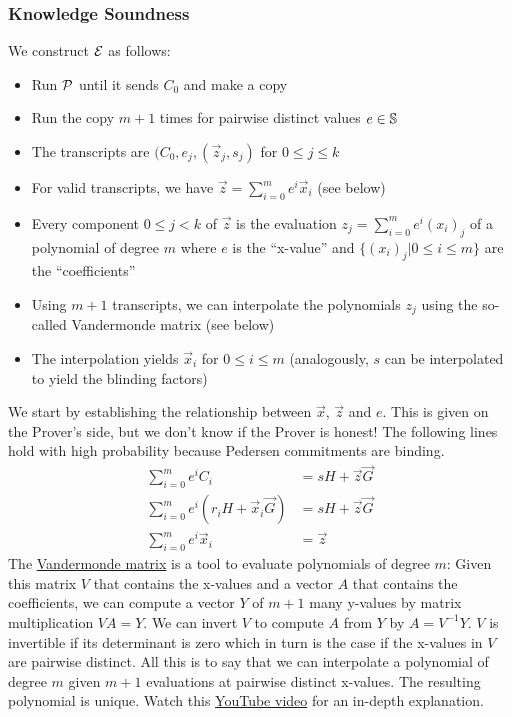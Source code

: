 \subsubsection{Knowledge Soundness}

We construct $\mathcal{E}$ as follows:
%
\begin{itemize}
    \item Run $\mathcal{P}$ until it sends $C_0$ and make a copy
    \item Run the copy $m + 1$ times for pairwise distinct values $e \in \mathbb{S}$
    \item The transcripts are $(C_0, e_j, (\vec{z}_j, s_j)$ for $0 \leq j \leq k$
    \item For valid transcripts, we have $\vec{z} = \sum^m_{i = 0} e^i \vec{x}_i$ (see below)
    \item Every component $0 \leq j < k$ of $\vec{z}$ is the evaluation $z_j = \sum^m_{i = 0} e^i (x_i)_j$ of a polynomial of degree $m$ where $e$ is the \enquote{x-value} and $\{ (x_i)_j \vert 0 \leq i \leq m \}$ are the \enquote{coefficients}
    \item Using $m + 1$ transcripts, we can interpolate the polynomials $z_j$ using the so-called Vandermonde matrix (see below)
    \item The interpolation yields $\vec{x}_i$ for $0 \leq i \leq m$ (analogously, $s$ can be interpolated to yield the blinding factors)
\end{itemize}
%
We start by establishing the relationship between $\vec{x}$, $\vec{z}$ and $e$.
This is given on the Prover's side, but we don't know if the Prover is honest!
The following lines hold with high probability because Pedersen commitments are binding.
%
\begin{align*}
    \sum^m_{i = 0} e^i C_i &= sH + \vec{z}\vec{G} \\
    \sum^m_{i = 0} e^i (r_iH + \vec{x}_i\vec{G}) &= sH + \vec{z}\vec{G} \\
    \sum^m_{i = 0} e^i \vec{x}_i &= \vec{z}
\end{align*}
%
The \href{https://en.wikipedia.org/wiki/Vandermonde\_matrix}{Vandermonde matrix} is a tool to evaluate polynomials of degree $m$:
Given this matrix $V$ that contains the x-values and a vector $A$ that contains the coefficients,
we can compute a vector $Y$ of $m + 1$ many y-values by matrix multiplication $VA = Y$.
%
We can invert $V$ to compute $A$ from $Y$ by $A = V^{-1}Y$.
$V$ is invertible if its determinant is zero which in turn is the case if the x-values in $V$ are pairwise distinct.
%
All this is to say that we can interpolate a polynomial of degree $m$ given $m + 1$ evaluations at pairwise distinct x-values.
The resulting polynomial is unique.
Watch this \href{https://yewtu.be/watch?v=Cov\_kLatdlc}{YouTube video} for an in-depth explanation.

